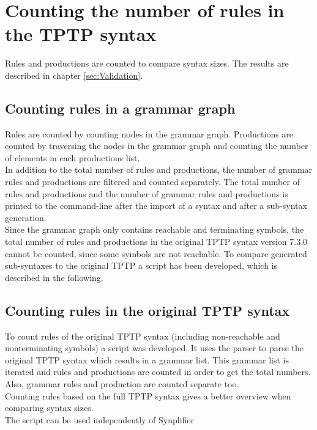 \section{Counting the number of rules in the TPTP syntax}\label{sec:ConceptCountR}

Rules and productions are counted to compare syntax sizes. The results are described in chapter \ref{sec:Validation}.

\subsection{Counting rules in a grammar graph}\label{sec:ConceptCountR}
 
Rules are counted by counting nodes in the grammar graph. Productions are counted by traversing the nodes in the grammar graph and counting the number of elements in each productions list.\\
In addition to the total number of rules and productions, the number of grammar rules and productions are filtered and counted separately.
The total number of rules and productions and the number of grammar rules and productions is printed to the command-line after the import of a syntax and after a sub-syntax generation. \\
Since the grammar graph only contains reachable and terminating symbols, the total number of rules and productions in the original \ac{TPTP} syntax version 7.3.0 cannot be counted, since some symbols are not reachable.
To compare generated sub-syntaxes to the original \ac{TPTP} a script has been developed, which is described in the following.

\subsection{Counting rules in the original \ac{TPTP} syntax}\label{sec:ConceptCountR}

To count rules of the original \ac{TPTP} syntax (including non-reachable and nonterminating symbols) a script was developed.
It uses the parser to parse the original \ac{TPTP} syntax which results in a grammar list. This grammar list is iterated and rules and productions are counted in order to get the total numbers. Also, grammar rules and production are counted separate too.\\
Counting rules based on the full \ac{TPTP} syntax gives a better overview when comparing syntax sizes.\\
The script can be used independently of \ac{Synplifier} 

